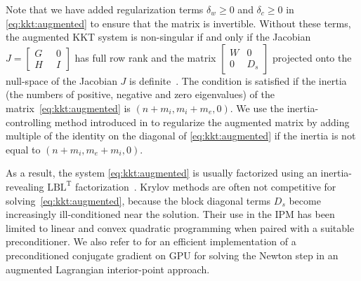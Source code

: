 \documentclass[smallextended]{svjour3}
\newcommand{\lblt}{$\mathrm{LBL^T}$\xspace}
\begin{document}
Note that we have added regularization terms $\delta_w \geq 0$
and $\delta_c \geq 0$ in \eqref{eq:kkt:augmented} to ensure that the
matrix is invertible.
Without these terms, the augmented KKT system is non-singular
if and only if the Jacobian $J = \begin{bmatrix} G \; &\; 0 \\ H \;&\; I \end{bmatrix}$
has full row rank and the matrix $\begin{bmatrix} W  & 0 \\ 0 & D_s \end{bmatrix}$
projected onto the null-space of the Jacobian $J$ is definite~\cite{benzi2005numerical}.
The condition is satisfied if the inertia (the numbers
of positive, negative and zero eigenvalues) of the matrix~\eqref{eq:kkt:augmented} is $(n + m_i, m_i + m_e, 0)$.
We use the inertia-controlling method introduced in \cite[Section 3.1]{wachter2006implementation}
to regularize the augmented matrix by adding multiple of the identity
on the diagonal of \eqref{eq:kkt:augmented} if the inertia is not equal to $(n+m_i, m_e+m_i, 0)$.

As a result, the system \eqref{eq:kkt:augmented} is usually factorized using
an inertia-revealing \lblt factorization~\cite{duff1983multifrontal}.
Krylov methods are often not competitive for solving~\eqref{eq:kkt:augmented},
because the block diagonal terms $D_s$ become increasingly
ill-conditioned near the solution. Their use in the IPM has been limited to
linear and convex quadratic programming \cite{gondzio-2012} when paired
with a suitable preconditioner. We also refer to \cite{cao2016augmented}
for an efficient implementation of a preconditioned conjugate gradient
on GPU for solving the Newton step in an augmented Lagrangian interior-point
approach.
\end{document}
